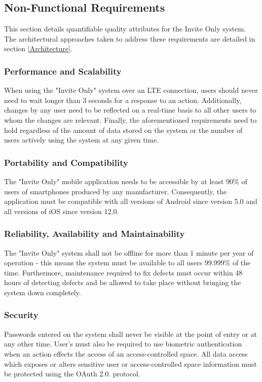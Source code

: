 \newpage

\subsection{Non-Functional Requirements} \label{Non-Functional Requirements}

This section details quantifiable quality attributes for the Invite Only system. The architectural approaches taken to address these requirements are detailed in section \ref{Architecture}.

\subsubsection{Performance and Scalability}
When using the "Invite Only" system over an LTE connection, users should never need to wait longer than 3 seconds for a response to an action. Additionally, changes by any user need to be reflected on a real-time basis to all other users to whom the changes are relevant. Finally, the aforementioned requirements need to hold regardless of the amount of data stored on the system or the number of users actively using the system at any given time.

\subsubsection{Portability and Compatibility}
The "Invite Only" mobile application needs to be accessible by at least 90\% of users of smartphones produced by any manufacturer. Consequently, the application must be compatible with all versions of Android since version 5.0 and all versions of iOS since version 12.0.

\subsubsection{Reliability, Availability and Maintainability}
The "Invite Only" system shall not be offline for more than 1 minute per year of operation - this means the system must be available to all users 99.999\% of the time. Furthermore, maintenance required to fix defects must occur within 48 hours of detecting defects and be allowed to take place without bringing the system down completely.

\subsubsection{Security}
Passwords entered on the system shall never be visible at the point of entry or at any other time. User's must also be required to use biometric authentication when an action effects the access of an access-controlled space. All data access which exposes or alters sensitive user or access-controlled space information must be protected using the OAuth 2.0. protocol.

